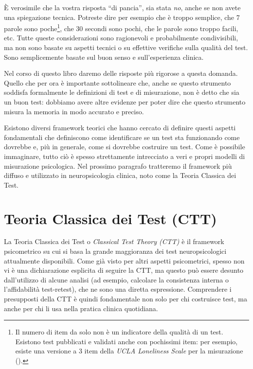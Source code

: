 \documentclass[
  italian,
  letterpaper,
  paper=6in:9in,
  pagesize=pdftex,
  headinclude=on,
  footinclude=on,
  11pt]{scrbook}
\begin{document}
È verosimile che la vostra risposta ``di pancia'', sia stata \emph{no},
anche se non avete una spiegazione tecnica. Potreste dire per esempio
che è troppo semplice, che 7 parole sono poche\footnote{Il numero di
  item da solo non è un indicatore della qualità di un test. Esistono
  test pubblicati e validati anche con pochissimi item: per esempio,
  esiste una versione a 3 item della \emph{UCLA Loneliness Scale} per la
  misurazione (\cite{gosling2024measuring}).}, che 30 secondi sono
pochi, che le parole sono troppo facili, etc. Tutte queste
considerazioni sono ragionevoli e probabilmente condivisibili, ma non
sono basate su aspetti tecnici o su effettive verifiche sulla qualità
del test. Sono semplicemente basate sul buon senso e sull'esperienza
clinica.

Nel corso di questo libro daremo delle risposte più rigorose a questa
domanda. Quello che per ora è importante sottolineare che, anche se
questo strumento soddisfa formalmente le definizioni di test e di
misurazione, non è detto che sia un buon test: dobbiamo avere altre
evidenze per poter dire che questo strumento misura la memoria in modo
accurato e preciso.

Esistono diversi framework teorici che hanno cercato di definire questi
aspetti fondamentali che definiscono come identificare se un test sta
funzionando come dovrebbe e, più in generale, come si dovrebbe costruire
un test. Come è possibile immaginare, tutto ciò è spesso strettamente
intrecciato a veri e propri modelli di misurazione psicologica. Nel
prossimo paragrafo tratteremo il framework più diffuso e utilizzato in
neuropsicologia clinica, noto come la Teoria Classica dei Test.

\section{Teoria Classica dei Test (CTT)}\label{teoria-classica-dei-test}

La Teoria Classica dei Test o \emph{Classical Test Theory (CTT)} è il
framework psicometrico su cui si basa la grande maggioranza dei test
neuropsicologici attualmente disponibili. Come già visto per altri
aspetti psicometrici, spesso non vi è una dichiarazione esplicita di
seguire la CTT, ma questo può essere desunto dall'utilizzo di alcune
analisi (ad esempio, calcolare la consistenza interna o l'affidabilità
test-retest), che ne sono una diretta espressione. Comprendere i
presupposti della CTT è quindi fondamentale non solo per chi costruisce
test, ma anche per chi li usa nella pratica clinica quotidiana.
\end{document}
